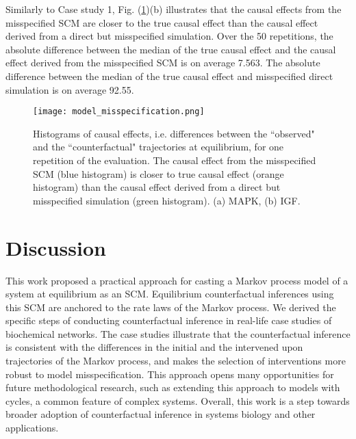 \documentclass{article}
\def\figref#1{Fig. (\ref{#1})}
\begin{document}
 Similarly to Case study 1, \figref{fig:misspecification}(b) illustrates that the causal effects from the misspecified SCM are closer to the true causal effect than the causal effect derived from a direct but misspecified simulation. Over the 50 repetitions, the absolute difference between the median of the true causal effect and the causal effect derived from the misspecified SCM is on average 7.563. The absolute difference between the median of the true causal effect and misspecified direct simulation is on average 92.55.
\begin{figure}[htbp!]
\begin{center}
\texttt{[image: model\_misspecification.png]}
\vspace{-.05in}
\caption{\small Histograms of causal effects, i.e. differences between the ``observed" and the ``counterfactual" trajectories at equilibrium, for one repetition of the evaluation. The causal effect from the misspecified SCM (blue histogram) is closer to true causal effect (orange histogram) than the causal effect derived from a direct but misspecified simulation (green histogram). (a) MAPK, (b) IGF.  \label{fig:misspecification}}
\end{center}
\end{figure}



\vspace{-9mm}
\section{Discussion}
\vspace{-2mm}
This work proposed a practical approach for casting a Markov process model of a system at equilibrium as an SCM. Equilibrium counterfactual inferences using this SCM are anchored to the rate laws of the Markov process. We derived the specific steps of conducting counterfactual inference in real-life case studies of biochemical networks. The case studies illustrate that the counterfactual inference is consistent with the differences in the initial and the intervened upon trajectories of the Markov process, and makes the selection of interventions more robust to model misspecification. This approach opens many opportunities for future methodological research, such as extending this approach to models with cycles, a common feature of complex systems. Overall, this work is a step towards broader adoption of counterfactual inference in systems biology and other applications.

\clearpage


\end{document}
